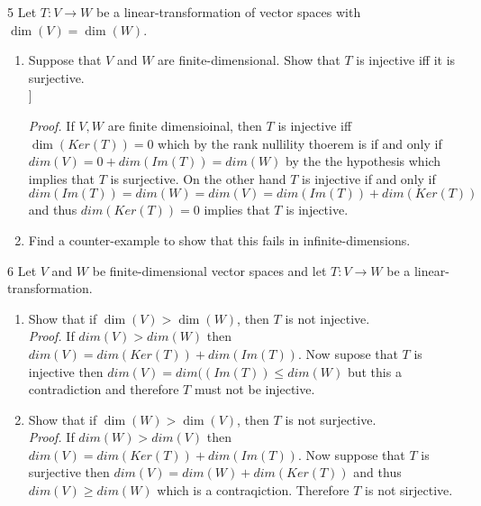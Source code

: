 \documentclass{exercises}
\begin{document}
\begin{exr}{}{5}
	Let $T\colon V\rightarrow W$ be a linear-transformation of vector spaces with $\dim (V)=\dim (W)$.
	\begin{enumerate}
		\item Suppose that $V$ and $W$ are finite-dimensional.  Show that $T$ is injective iff it is surjective. \\]

		\emph{Proof.} If $V, W$ are finite dimensioinal, then $T$ is injective iff $\dim(Ker(T)) = 0$ which by the rank nullility thoerem is if and only if $dim(V) = 0 + dim(Im(T)) = dim(W)$ by the the hypothesis which implies that $T$ is surjective. On the other hand $T$ is injective if and only if $dim(Im(T)) = dim(W) = dim(V) = dim(Im(T)) + dim(Ker(T))$ and thus $dim(Ker(T)) = 0$ implies that $T$ is injective.

		\item Find a counter-example to show that this fails in infinite-dimensions.
	\end{enumerate}
\end{exr}

\begin{exr}{}{6}
	Let $V$ and $W$ be finite-dimensional vector spaces and let $T\colon V\rightarrow W$ be a linear-transformation.
	\begin{enumerate}
		\item Show that if $\dim (V)>\dim (W)$, then $T$ is not injective. \\

		\emph{Proof.}
		If $dim(V) > dim(W)$ then $dim(V) = dim(Ker(T)) + dim(Im(T))$. Now supose that $T$ is injective then $dim(V) = dim((Im(T)) \leq dim(W)$ but this a contradiction and therefore $T$ must not be injective.
		\item Show that if $\dim (W)>\dim (V)$, then $T$ is not surjective. \\

		\emph{Proof.}
		If $dim(W) > dim(V)$ then $dim(V) = dim(Ker(T)) + dim(Im(T)).$ Now suppose that $T$ is surjective then $dim(V) = dim(W) + dim(Ker(T))$ and thus $dim(V) \geq dim(W)$ which is a contraqiction. Therefore $T$ is not sirjective.
	\end{enumerate}
\end{exr}
\end{document}
